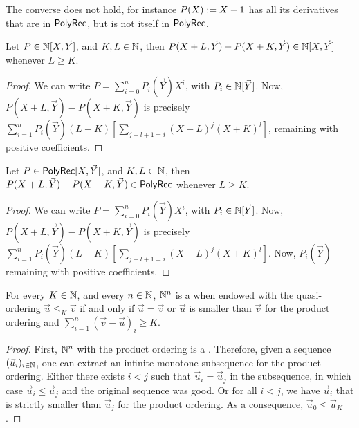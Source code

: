 \begin{remark}
    The converse does not hold,
    for instance $P(X) \mathrel{:=} X - 1$ has all its derivatives
    that are in $\mathsf{PolyRec}$, but is not itself in $\mathsf{PolyRec}$.
\end{remark}

\begin{fact}
    Let $P \in \mathbb{N}[X,\vec{Y}]$, and $K,L \in \mathbb{N}$,
    then $P(X+L, \vec{Y}) - P(X+K,\vec{Y}) \in \mathbb{N}[X, \vec{Y}]$
    whenever $L \geq K$.
\end{fact}
\begin{proof}
    We can write
    $P = \sum_{i = 0}^n P_i(\vec{Y}) X^i$, with $P_i \in \mathbb{N}[\vec{Y}]$.
    Now,
    $P(X+L,\vec{Y}) - P(X+K,\vec{Y})$
    is precisely
    $\sum_{i = 1}^n P_i(\vec{Y}) (L-K) \left[ \sum_{j + l + 1= i} (X+L)^j (X+K)^l \right]$,
    remaining with positive coefficients.
\end{proof}

\begin{fact}
    Let $P \in \mathsf{PolyRec}[X,\vec{Y}]$, and $K,L \in \mathbb{N}$,
    then $P(X+L, \vec{Y}) - P(X+K,\vec{Y}) \in \mathsf{PolyRec}$
    whenever $L \geq K$.
\end{fact}
\begin{proof}
    We can write
    $P = \sum_{i = 0}^n P_i(\vec{Y}) X^i$, with $P_i \in \mathbb{N}[\vec{Y}]$.
    Now,
    $P(X+L,\vec{Y}) - P(X+K,\vec{Y})$
    is precisely
    $\sum_{i = 1}^n P_i(\vec{Y}) (L-K) \left[ \sum_{j + l + 1= i} (X+L)^j (X+K)^l \right]$.
    Now, $P_i(\vec{Y})$
    remaining with positive coefficients.
\end{proof}
\begin{fact}
    For every $K \in \mathbb{N}$, and every $n \in \mathbb{N}$,
    $\mathbb{N}^n$ is a 
    when endowed with the quasi-ordering $\vec{u} \leq_K \vec{v}$
    if and only if $\vec{u} = \vec{v}$ or
    $\vec{u}$ is smaller than $\vec{v}$ for the product ordering and
    $\sum_{i = 1}^n  (\vec{v} - \vec{u})_i \geq K$.
\end{fact}
\begin{proof}
    First, $\mathbb{N}^n$ with the product ordering is a .
    Therefore, given a sequence $(\vec{u}_i)_{i \in \mathbb{N}}$,
    one can extract an infinite monotone subsequence for
    the product ordering.
    Either there exists $i < j$ such that $\vec{u}_i = \vec{u}_j$
    in the subsequence, in which case $\vec{u}_i \leq \vec{u}_j$
    and the original sequence was good. Or for all $i < j$,
    we have $\vec{u}_i$ that is strictly smaller than 
    $\vec{u}_j$ for the product ordering. As a consequence,
    $\vec{u}_0 \leq \vec{u}_K$.
\end{proof}



